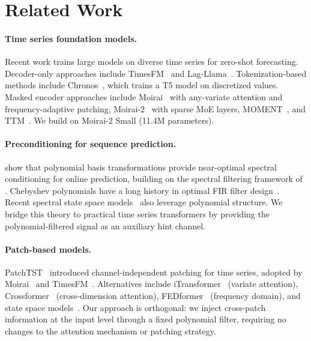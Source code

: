 \documentclass{article}
\begin{document}
\section{Related Work}

\paragraph{Time series foundation models.}
Recent work trains large models on diverse time series for zero-shot forecasting. Decoder-only approaches include TimesFM~\citep{das2024decoder} and Lag-Llama~\citep{rasul2024lagllama}. Tokenization-based methods include Chronos~\citep{ansari2024chronos}, which trains a T5 model on discretized values. Masked encoder approaches include Moirai~\citep{woo2024unified} with any-variate attention and frequency-adaptive patching, Moirai-2~\citep{liu2024moirai2} with sparse MoE layers, MOMENT~\citep{goswami2024moment}, and TTM~\citep{ekambaram2024ttm}. We build on Moirai-2 Small (11.4M parameters).

\paragraph{Preconditioning for sequence prediction.}
\citet{marsden2024universal} show that polynomial basis transformations provide near-optimal spectral conditioning for online prediction, building on the spectral filtering framework of \citet{hazan2017learning,hazan2018spectral}. Chebyshev polynomials have a long history in optimal FIR filter design~\citep{parks1972chebyshev,oppenheim1999discrete,mcclellan1973program}. Recent spectral state space models~\citep{agarwal2025spectral,dao2024flashstu} also leverage polynomial structure. We bridge this theory to practical time series transformers by providing the polynomial-filtered signal as an auxiliary hint channel.

\paragraph{Patch-based models.}
PatchTST~\citep{nie2023patchtst} introduced channel-independent patching for time series, adopted by Moirai~\citep{woo2024unified} and TimesFM~\citep{das2024decoder}. Alternatives include iTransformer~\citep{liu2024itransformer} (variate attention), Crossformer~\citep{zhang2023crossformer} (cross-dimension attention), FEDformer~\citep{zhou2022fedformer} (frequency domain), and state space models~\citep{gu2022efficiently,gu2024mamba}. Our approach is orthogonal: we inject cross-patch information at the input level through a fixed polynomial filter, requiring no changes to the attention mechanism or patching strategy.
\end{document}
